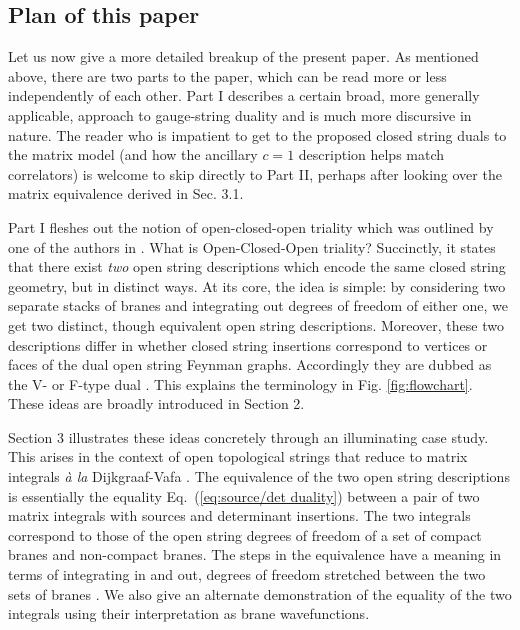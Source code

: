 \documentclass[english]{article}
\begin{document}
\subsection{Plan of this paper}

Let us now give a more detailed breakup of the present paper.
As mentioned above, there are two parts to the paper, which can be read more or less independently of each other. Part I describes a certain broad, more generally applicable, approach to gauge-string duality and is much more discursive in nature. The reader who is impatient to get to the proposed closed string duals to the matrix model (and how the ancillary $c=1$ description helps match correlators) is welcome to skip directly to Part II, perhaps after looking over the matrix equivalence derived in Sec. 3.1. 

Part I fleshes out the notion of open-closed-open triality which was outlined by one of the authors in \cite{Joburg}. 
What is Open-Closed-Open triality? Succinctly, it states that there exist \textit{two} open string descriptions which encode the same closed string geometry, but in distinct ways. 
At its core, the idea is simple: by considering two separate stacks of branes and integrating out degrees of freedom of either one, we get two distinct, though equivalent open string descriptions. Moreover, these two descriptions differ in whether closed string insertions correspond to vertices or faces of the dual open string Feynman graphs. Accordingly they are dubbed as the V- or F-type dual \cite{Joburg}. This explains the terminology in Fig. \ref{fig:flowchart}. These ideas are broadly introduced in Section 2. 

Section 3 illustrates these ideas concretely through an illuminating case study. This arises in the context of open topological strings that reduce to matrix integrals \textit{\`a la} Dijkgraaf-Vafa \cite{DijkgraafVafa02, Aganagic_2005}. The  equivalence of the two open string descriptions is essentially the equality Eq.~(\ref{eq:source/det duality}) between a pair of two matrix integrals with sources and determinant insertions. The two integrals correspond to those of the open string degrees of freedom of a set of compact branes and non-compact branes. The steps in the equivalence have a meaning in terms of integrating in and out, degrees of freedom stretched between the two sets of branes \cite{Maldacena:2005hi}. We also give an alternate demonstration of the equality of the two integrals using their interpretation as brane wavefunctions. 
\end{document}
